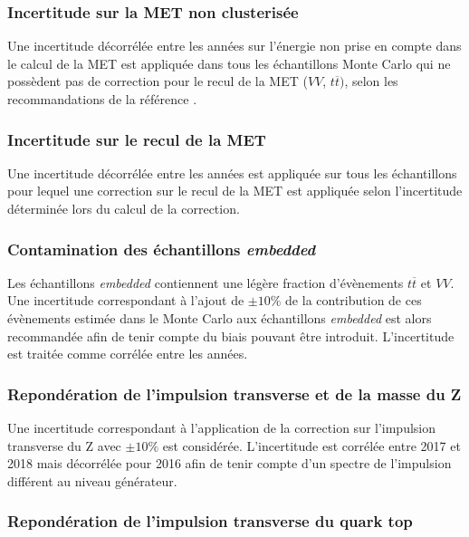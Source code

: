 \subsubsection{ Incertitude sur la MET non clusterisée}

Une incertitude décorrélée entre les années sur l'énergie non prise en compte dans le calcul de la MET est appliquée dans tous les échantillons Monte Carlo qui ne possèdent pas de correction pour le recul de la MET ($VV$, $t\overline{t})$, selon les recommandations de la référence \cite{METuncert}.

\subsubsection{ Incertitude sur le recul de la MET}

Une incertitude décorrélée entre les années est appliquée sur tous les échantillons pour lequel une correction sur le recul de la MET est appliquée selon l'incertitude déterminée lors du calcul de la correction.

\subsubsection{ Contamination des échantillons \textit{embedded}}

Les échantillons \textit{embedded} contiennent une légère fraction d'évènements $t\overline{t}$ et $VV$. Une incertitude correspondant à l'ajout de $\pm10\%$ de la contribution de ces évènements estimée dans le Monte Carlo aux échantillons \textit{embedded} est alors recommandée \cite{Emb16,Emb17,Emb18} afin de tenir compte du biais pouvant être introduit. L'incertitude est traitée comme corrélée entre les années.

\subsubsection{ Repondération de l'impulsion transverse et de la masse du Z}

Une incertitude correspondant à l'application de la correction sur l'impulsion transverse du Z avec $\pm10\%$ est considérée. L'incertitude est corrélée entre 2017 et 2018 mais décorrélée pour 2016 afin de tenir compte d'un spectre de l'impulsion différent au niveau générateur.

\subsubsection{ Repondération de l'impulsion transverse du quark top}

